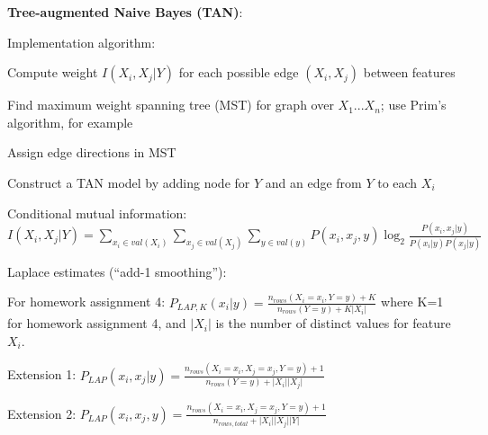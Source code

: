 \documentclass[letterpaper,fontsize=5pt]{scrartcl}
\renewenvironment{enumerate}[1]{\begin{compactenum}#1}{\end{compactenum}}
\theoremstyle{definition}
\newcommand{\abs}[1]{\lvert#1\rvert}
\begin{document}
\begin{multicols}{2}
\begin{enumerate}
\begin{enumerate}
			\end{enumerate}
		\item \textbf{Tree-augmented Naive Bayes (TAN)}:
			\begin{enumerate}
				\item Implementation algorithm:
					\begin{enumerate}
						\item Compute weight $I(X_i,X_j|Y)$ for each possible edge $(X_i,X_j)$ between features
						\item Find maximum weight spanning tree (MST) for graph over $X_1 ... X_n$; use Prim's algorithm, for example
						\item Assign edge directions in MST
						\item Construct a TAN model by adding node for $Y$ and an edge from $Y$ to each $X_i$
					\end{enumerate}
				\item Conditional mutual information: \\ $I(X_i,X_j|Y) = \sum\limits_{x_i \in val(X_i)} \sum\limits_{x_j \in val(X_j)} \sum\limits_{y \in val(y)} P(x_i,x_j,y) \log_{2} \frac{P(x_i,x_j|y)}{P(x_i|y)P(x_j|y)}$ 
				\item Laplace estimates (``add-1 smoothing''): 
					\begin{enumerate}
						\item For homework assignment 4: $P_{LAP,K}(x_i|y) = \frac{n_{rows}(X_i=x_i,Y=y)+K}{n_{rows}(Y=y)+K\abs{X_i}}$ where K=1 for homework assignment 4, and $\abs{X_i}$ is the number of distinct values for feature $X_i$.
						\item Extension 1: $P_{LAP}(x_i,x_j|y) = \frac{n_{rows}(X_i=x_i,X_j=x_j,Y=y)+1}{n_{rows}(Y=y) + \abs{X_i}\abs{X_j}}$
						\item Extension 2: $P_{LAP}(x_i,x_j,y) = \frac{n_{rows}(X_i=x_i,X_j=x_j,Y=y)+1}{n_{rows,total} + \abs{X_i}\abs{X_j}\abs{Y}}$
					\end{enumerate}
			\end{enumerate}
	\end{enumerate}

\end{multicols}
\end{document}
